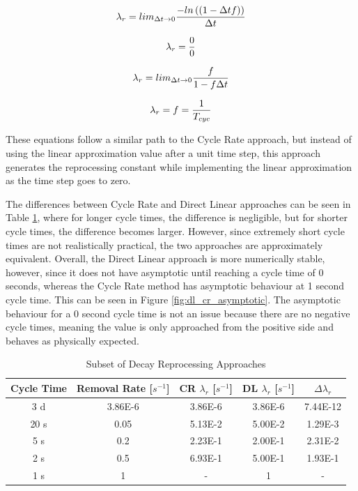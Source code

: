 \begin{equation} \hfill
\lambda_r = lim_{\Delta t \to 0} \frac{-ln\left((1 - \Delta t f)\right)}{\Delta t}
\hfill\label{eq:dir_lin_7} \end{equation}

\begin{equation} \hfill
\lambda_r = \frac{0}{0}
\hfill\label{eq:dir_lin_8} \end{equation}

\begin{equation} \hfill
\lambda_r = lim_{\Delta t \to 0} \frac{f}{1-f\Delta t}
\hfill\label{eq:dir_lin_9} \end{equation}

\begin{equation} \hfill
\lambda_r = f = \frac{1}{T_{cyc}}
\hfill\label{eq:dir_lin_10} \end{equation}

These equations follow a similar path to the Cycle Rate approach, but instead of using the linear approximation value after a unit time step, this approach generates the reprocessing constant while implementing the linear approximation as the time step goes to zero.

The differences between Cycle Rate and Direct Linear approaches can be seen in Table \ref{tab:repr_decay_view}, where for longer cycle times, the difference is negligible, but for shorter cycle times, the difference becomes larger. However, since extremely short cycle times are not realistically practical, the two approaches are approximately equivalent. Overall, the Direct Linear approach is more numerically stable, however, since it does not have asymptotic until reaching a cycle time of 0 seconds, whereas the Cycle Rate method has asymptotic behaviour at 1 second cycle time. This can be seen in Figure \ref{fig:dl_cr_asymptotic}. The asymptotic behaviour for a 0 second cycle time is not an issue because there are no negative cycle times, meaning the value is only approached from the positive side and behaves as physically expected.

\begin{table}[H]
\renewcommand{\arraystretch}{1.25}
\caption{Subset of Decay Reprocessing Approaches}
\label{tab:repr_decay_view}
\begin{center}
\begin{tabular}{ | c | c | c | c | c | }
 \hline
 Cycle Time & Removal Rate [$s^{-1}$] & CR $\lambda_{r}$ [$s^{-1}$] & DL $\lambda_{r}$ [$s^{-1}$] & $\Delta \lambda_{r}$\\
 \hline
 \hline
 3 d & 3.86E-6 & 3.86E-6 & 3.86E-6 & 7.44E-12\\
 20 s & 0.05 & 5.13E-2 & 5.00E-2 & 1.29E-3\\
 5 s & 0.2 & 2.23E-1 & 2.00E-1 & 2.31E-2\\
 2 s & 0.5 & 6.93E-1 & 5.00E-1 & 1.93E-1\\
 1 s & 1 & - & 1 & -\\
 \hline
\end{tabular}
\end{center}
\end{table}

